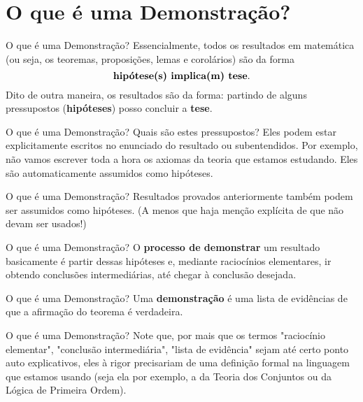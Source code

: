 \documentclass[10pt]{beamer}
\renewcommand{\indent}{\hspace*{2em}}
\theoremstyle{plain}
\begin{document}
\section{O que é uma Demonstração?}

\begin{frame}{O que é uma Demonstração?}
 \indent Essencialmente, todos os resultados em matemática (ou seja, os teoremas, proposições, lemas e corolários) são da forma
 $$\mbox{\textbf{hipótese(s) implica(m) tese}}.$$ 
 Dito de outra maneira, os resultados são da forma: partindo de alguns pressupostos (\textbf{hipóteses}) posso concluir a \textbf{tese}.
\end{frame}

\begin{frame}{O que é uma Demonstração?}
 \indent Quais são estes pressupostos? Eles podem estar explicitamente escritos no enunciado do resultado ou subentendidos. Por exemplo, não vamos escrever toda a hora os axiomas da teoria que estamos estudando. Eles são automaticamente assumidos como hipóteses.
\end{frame}

\begin{frame}{O que é uma Demonstração?}
 \indent Resultados provados anteriormente também podem ser assumidos como hipóteses. (A menos que haja menção explícita de que não devam ser usados!)
\end{frame}

\begin{frame}{O que é uma Demonstração?}
 \indent O \textbf{processo de demonstrar} um resultado basicamente é partir dessas hipóteses e, mediante raciocínios elementares, ir obtendo conclusões intermediárias, até chegar à conclusão desejada.
\end{frame}

\begin{frame}{O que é uma Demonstração?}
 \indent Uma \textbf{demonstração} é uma lista de evidências de que a afirmação do teorema é verdadeira.
\end{frame}

\begin{frame}{O que é uma Demonstração?}
 \indent Note que, por mais que os termos "raciocínio elementar", "conclusão intermediária", "lista de evidência" sejam até certo ponto auto explicativos, eles à rigor precisariam de uma definição formal na linguagem que estamos usando (seja ela por exemplo, a da Teoria dos Conjuntos ou da Lógica de Primeira Ordem).
\end{frame}
\end{document}
